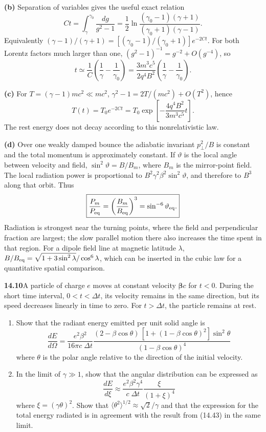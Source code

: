 \textbf{(b)} Separation of variables gives the useful exact relation
\[
Ct=\int_\gamma^{\gamma_0}\frac{dg}{g^2-1}
=\frac12\ln\frac{(\gamma_0-1)(\gamma+1)}
{(\gamma_0+1)(\gamma-1)}.
\]
Equivalently $(\gamma-1)/(\gamma+1)
=[(\gamma_0-1)/(\gamma_0+1)]e^{-2Ct}$.
For both Lorentz factors much larger than one,
$(g^2-1)^{-1}=g^{-2}+O(g^{-4})$, so
\[
\boxed{t\simeq\frac1C\left(\frac1\gamma-\frac1{\gamma_0}\right)
=\frac{3m^3c^5}{2q^4B^2}
\left(\frac1\gamma-\frac1{\gamma_0}\right).}
\]

\textbf{(c)} For $T=(\gamma-1)mc^2\ll mc^2$,
$\gamma^2-1=2T/(mc^2)+O(T^2)$, hence
\[
\boxed{T(t)=T_0e^{-2Ct}
=T_0\exp\left[-\frac{4q^4B^2}{3m^3c^5}t\right].}
\]
The rest energy does not decay according to this nonrelativistic law.

\textbf{(d)} Over one weakly damped bounce the adiabatic invariant
$p_\perp^2/B$ is constant and the total momentum is approximately
constant. If $\vartheta$ is the local angle between velocity and field,
$\sin^2\vartheta=B/B_m$, where $B_m$ is the mirror-point field.
The local radiation power is proportional to
$B^2\gamma^2\beta^2\sin^2\vartheta$, and therefore to $B^3$ along
that orbit. Thus
\[
\boxed{\frac{P_m}{P_{\rm eq}}=
\left(\frac{B_m}{B_{\rm eq}}\right)^3
=\sin^{-6}\vartheta_{\rm eq}.}
\]
Radiation is strongest near the turning points, where the field and
perpendicular fraction are largest; the slow parallel motion there
also increases the time spent in that region.
For a dipole field line at magnetic latitude $\lambda$,
$B/B_{\rm eq}=\sqrt{1+3\sin^2\lambda}/\cos^6\lambda$, which can be
inserted in the cubic law for a quantitative spatial comparison.

\par\bigskip
\noindent\textbf{14.10}\quad A particle of charge $e$ moves at constant velocity $\boldsymbol{\beta}c$ for $t<0$. During the short time interval, $0<t<\Delta t$, its velocity remains in the same direction, but its speed decreases linearly in time to zero. For $t>\Delta t$, the particle remains at rest.
\begin{enumerate}
\item[(a)] Show that the radiant energy emitted per unit solid angle is
\[
\frac{dE}{d\Omega}=\frac{e^{2}\beta^{2}}{16\pi c\;\Delta t}\frac{(2-\beta\cos\theta)\,[1+(1-\beta\cos\theta)^{2}]\sin^{2}\theta}{(1-\beta\cos\theta)^{4}}
\]
where $\theta$ is the polar angle relative to the direction of the initial velocity.
\item[(b)] In the limit of $\gamma\gg1$, show that the angular distribution can be expressed as
\[
\frac{dE}{d\xi}\approx\frac{e^{2}\beta^{2}\gamma^{4}}{c\;\Delta t}\frac{\xi}{(1+\xi)^{4}}
\]
where $\xi=(\gamma\theta)^{2}$. Show that $\langle\theta^{2}\rangle^{1/2}\approx\sqrt{2}/\gamma$ and that the expression for the total energy radiated is in agreement with the result from (14.43) in the same limit.
\end{enumerate}
\solution

